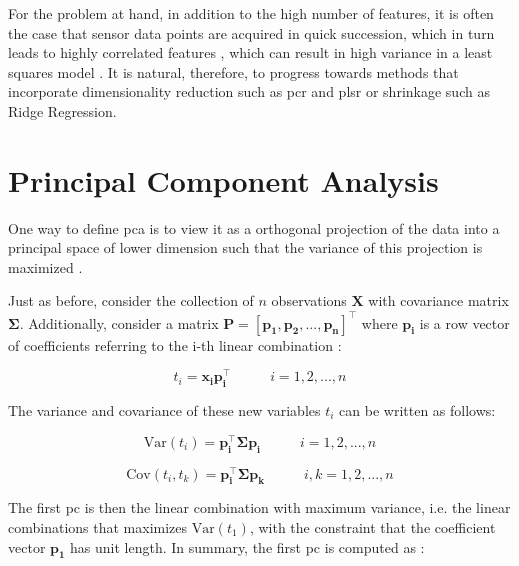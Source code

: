 For the problem at hand, in addition to the high number of features, it is often the case that sensor data points are acquired in quick succession, which in turn leads to highly correlated features \parencite{Bastuck_2019}, which can result in high variance in a least squares model \parencite{friedman2001}. It is natural, therefore, to progress towards methods that incorporate dimensionality reduction such as \acrfull{pcr} and \acrfull{plsr} or shrinkage such as Ridge Regression.

\section{Principal Component Analysis}
\label{sec:pca}

One way to define \acrfull{pca} is to view it as a orthogonal projection of the data into a principal space of lower dimension such that the variance of this projection is maximized \parencite{bishop2006pattern}.

Just as before, consider the  collection of $n$ observations  $\mathbf{X}$ with covariance matrix $\mathbf{\Sigma}$. Additionally, consider a matrix $\mathbf{P = [p_1, p_2, ..., p_n]^\intercal}$ where $\mathbf{p_i}$ is a row vector of coefficients referring to the i-th linear combination \parencite{johnson2013applied}:

\begin{equation}
	\label{eqn:pca-lincomb}
	t_i=\mathbf{x_i p_i^\intercal} \;\;\;\;\;\;\;\;\;\; i = 1, 2, ..., n
\end{equation}

The variance and covariance of these new variables $t_i$ can be written as follows:

\begin{equation}
	\label{eqn:pca-var}
	\text{Var}(t_i) = \mathbf{p_i^\intercal \Sigma p_i} \;\;\;\;\;\;\;\;\;\; i = 1, 2, ..., n
\end{equation}

\begin{equation}
	\label{eqn:pca-cov}
	\text{Cov}(t_i, t_k) = \mathbf{p_i^\intercal \Sigma p_k}\;\;\;\;\;\;\;\;\;\; i,k= 1, 2, ..., n
\end{equation}

The first \acrfull{pc} is then the linear combination with maximum variance, i.e. the linear combinations that maximizes $\text{Var}(t_1)$, with the constraint that the coefficient vector $\mathbf{p_1}$ has unit length. In summary, the first \acrshort{pc} is computed as \parencite{johnson2013applied}:

